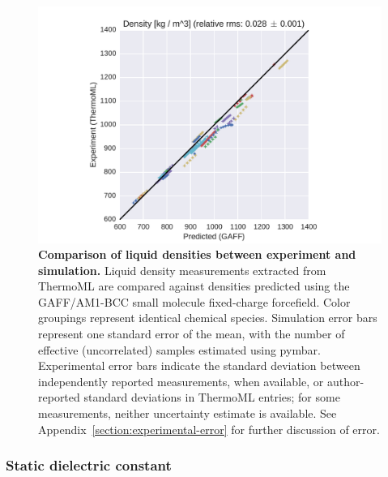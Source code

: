 \documentclass[aps,pre,twocolumn,nofootinbib,superscriptaddress,linenumbers]{revtex4-1}
\begin{document}

\begin{figure}
\includegraphics[width=\columnwidth]{./figures/densities_thermoml.pdf}
\caption{{\bf Comparison of liquid densities between experiment and simulation.}
Liquid density measurements extracted from ThermoML are compared against densities predicted using the GAFF/AM1-BCC small molecule fixed-charge forcefield.
Color groupings represent identical chemical species.  
Simulation error bars represent one standard error of the mean, with the number of effective (uncorrelated) samples estimated using pymbar.  
Experimental error bars indicate the standard deviation between independently reported measurements, when available, or author-reported standard deviations in ThermoML entries; for some measurements, neither uncertainty estimate is available.  
See Appendix~\ref{section:experimental-error} for further discussion of error.
}
\label{figure:Density}
\end{figure}


\subsubsection{Static dielectric constant}
\end{document}
